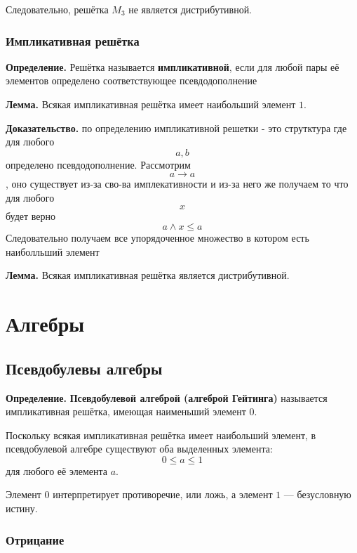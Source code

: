 \documentclass[12pt,a4paper,oneside,openany]{book}
\theoremstyle{definition}
\theoremstyle{plain}
\theoremstyle{remark}
\begin{document}
Следовательно, решётка \(M_3\) не является дистрибутивной.

\subsubsection{Импликативная решётка}

\textbf{Определение.}
Решётка называется \textbf{импликативной}, если для любой пары её элементов определено соответствующее псевдодополнение 


\textbf{Лемма.}
Всякая импликативная решётка имеет наибольший элемент \(1\).


\textbf{Доказательство.}
по определению импликативной решетки - это струтктура где для любого \[a,b\] определено псевдодополнение.
Рассмотрим \[a \to a\], оно существует из-за сво-ва имплекативности и из-за него же получаем то что для любого \[x\]
будет верно \[a\wedge x\leq a\]
Следовательно получаем все упорядоченное множество в котором есть наиболльший элемент


\textbf{Лемма.}
Всякая импликативная решётка является дистрибутивной.
















\section{Алгебры}

\subsection{Псевдобулевы алгебры}

\textbf{Определение.}
\textbf{Псевдобулевой алгеброй (алгеброй Гейтинга)} называется импликативная решётка,
имеющая наименьший элемент \(0\).

Поскольку всякая импликативная решётка имеет наибольший элемент,
в псевдобулевой алгебре существуют оба выделенных элемента:
\[
0\leq a\leq1
\]
для любого её элемента \(a\).

Элемент \(0\) интерпретирует противоречие, или ложь, а элемент \(1\)
--- безусловную истину.

\subsubsection{Отрицание}
\end{document}
